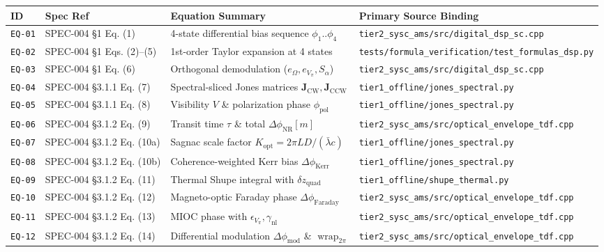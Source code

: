 \documentclass[11pt,a4paper]{article}
\begin{document}
\scriptsize
\begin{longtable}{@{}l l l l@{}}
\toprule
\textbf{ID} & \textbf{Spec Ref} & \textbf{Equation Summary} & \textbf{Primary Source Binding} \\
\midrule
\endhead
\texttt{EQ-01} & SPEC-004 \S 1 Eq. (1) & 4-state differential bias sequence $\phi_1..\phi_4$ & \texttt{tier2\_sysc\_ams/src/digital\_dsp\_sc.cpp} \\
\texttt{EQ-02} & SPEC-004 \S 1 Eqs. (2)--(5) & 1st-order Taylor expansion at 4 states & \texttt{tests/formula\_verification/test\_formulas\_dsp.py} \\
\texttt{EQ-03} & SPEC-004 \S 1 Eq. (6) & Orthogonal demodulation ($e_\Omega, e_{V_\pi}, S_\alpha$) & \texttt{tier2\_sysc\_ams/src/digital\_dsp\_sc.cpp} \\
\texttt{EQ-04} & SPEC-004 \S 3.1.1 Eq. (7) & Spectral-sliced Jones matrices $\mathbf{J}_{\text{CW}}, \mathbf{J}_{\text{CCW}}$ & \texttt{tier1\_offline/jones\_spectral.py} \\
\texttt{EQ-05} & SPEC-004 \S 3.1.1 Eq. (8) & Visibility $V$ \& polarization phase $\phi_{\text{pol}}$ & \texttt{tier1\_offline/jones\_spectral.py} \\
\texttt{EQ-06} & SPEC-004 \S 3.1.2 Eq. (9) & Transit time $\tau$ \& total $\Delta\phi_{\text{NR}}[m]$ & \texttt{tier2\_sysc\_ams/src/optical\_envelope\_tdf.cpp} \\
\texttt{EQ-07} & SPEC-004 \S 3.1.2 Eq. (10a) & Sagnac scale factor $K_{\text{opt}} = 2\pi L D/(\bar{\lambda} c)$ & \texttt{tier1\_offline/jones\_spectral.py} \\
\texttt{EQ-08} & SPEC-004 \S 3.1.2 Eq. (10b) & Coherence-weighted Kerr bias $\Delta\phi_{\text{Kerr}}$ & \texttt{tier1\_offline/jones\_spectral.py} \\
\texttt{EQ-09} & SPEC-004 \S 3.1.2 Eq. (11) & Thermal Shupe integral with $\delta z_{\text{quad}}$ & \texttt{tier1\_offline/shupe\_thermal.py} \\
\texttt{EQ-10} & SPEC-004 \S 3.1.2 Eq. (12) & Magneto-optic Faraday phase $\Delta\phi_{\text{Faraday}}$ & \texttt{tier2\_sysc\_ams/src/optical\_envelope\_tdf.cpp} \\
\texttt{EQ-11} & SPEC-004 \S 3.1.2 Eq. (13) & MIOC phase with $\epsilon_{V_\pi}, \gamma_{\text{nl}}$ & \texttt{tier2\_sysc\_ams/src/optical\_envelope\_tdf.cpp} \\
\texttt{EQ-12} & SPEC-004 \S 3.1.2 Eq. (14) & Differential modulation $\Delta\phi_{\text{mod}}$ \& $\operatorname{wrap}_{2\pi}$ & \texttt{tier2\_sysc\_ams/src/optical\_envelope\_tdf.cpp} \\

\end{longtable}
\end{document}

